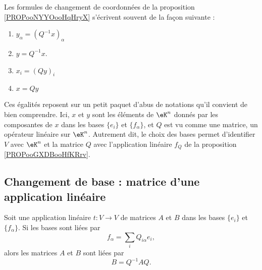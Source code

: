 \begin{normaltext}      \label{NORMooNWKZooPMwYTO}
    Les formules de changement de coordonnées de la proposition \ref{PROPooNYYOooHqHryX} s'écrivent souvent de la façon suivante :
    \begin{enumerate}
            \item       \label{ITEMooLHQCooBRvSlp}
                \( y_{\alpha}=(Q^{-1}x)_{\alpha}\)
            \item       \label{ITEMooNXUGooJIeoBf}
                \( y=Q^{-1}x\).
            \item       \label{ITEMooEFILooNENamW}
            $x_i=(Qy)_i $
            \item       \label{ITEMooMOKHooFEJvIW}
            $x=Qy$
    \end{enumerate}
    Ces égalités reposent sur un petit paquet d'abus de notations qu'il convient de bien comprendre. Ici, \( x\) et \( y\) sont les éléments de \( \eK^n\) donnés par les composantes de \( x\) dans les bases \( \{ e_i \}\) et \( \{ f_{\alpha} \}\), et \( Q\) est vu comme une matrice, un opérateur linéaire sur \( \eK^n\). Autrement dit, le choix des bases permet d'identifier \( V\) avec \( \eK^n\) et la matrice \( Q\) avec l'application linéaire \( f_Q\) de la proposition \ref{PROPooGXDBooHfKRrv}.
\end{normaltext}

\subsection{Changement de base : matrice d'une application linéaire}

\begin{proposition}     \label{PROPooNZBEooWyCXTw}
    Soit une application linéaire \( t\colon V\to V\) de matrices \( A\) et \( B\) dans les bases \( \{ e_i \}\) et \( \{ f_{\alpha} \}\). Si les bases sont liées par
    \begin{equation}
        f_{\alpha}=\sum_iQ_{i\alpha}e_i,
    \end{equation}
    alors les matrices \( A\) et \( B\) sont liées par
    \begin{equation}
        B=Q^{-1}AQ.
    \end{equation}
\end{proposition}

